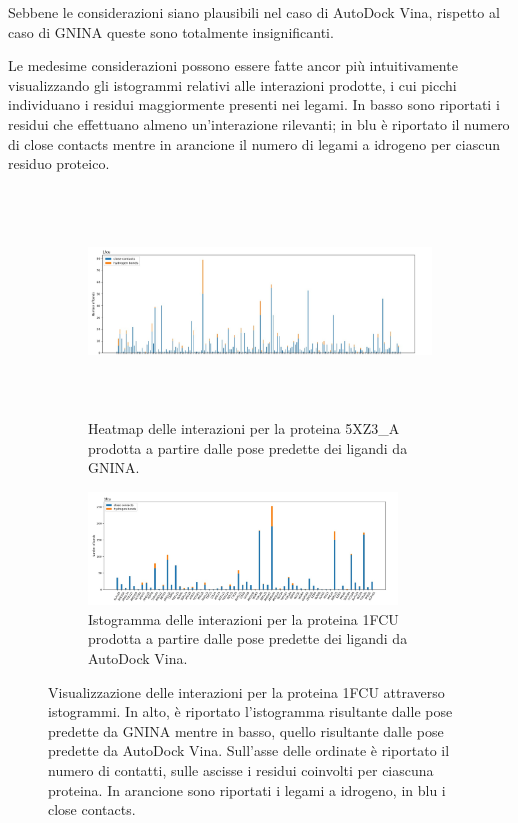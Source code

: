 Sebbene le considerazioni siano plausibili nel caso di AutoDock Vina, rispetto al caso di GNINA queste sono totalmente insignificanti.

Le medesime considerazioni possono essere fatte ancor più intuitivamente visualizzando gli istogrammi relativi alle interazioni prodotte, i cui picchi individuano i residui maggiormente presenti nei legami. In basso sono riportati i residui che effettuano almeno un'interazione rilevanti; in blu è riportato il numero di close contacts mentre in arancione il numero di legami a idrogeno per ciascun residuo proteico.

\begin{figure}
    \centering
    \begin{subfigure}[b]{\textwidth}
        \centering
        \includegraphics[width=\textwidth, height=6cm]{images/chapter4/interactions/interactions_gnina_1fcu.jpg}
        \caption[]%
        {{\small Heatmap delle interazioni per la proteina 5XZ3\_A prodotta a partire dalle pose predette dei ligandi da GNINA.}}    
        \label{fig:interactions_gnina_1fcu}
    \end{subfigure}
    \hfill
    \begin{subfigure}[b]{\textwidth}  
        \centering 
        \includegraphics[width=0.9\textwidth, height=3cm]{images/chapter4/interactions/interactions_vina_1fcu.jpg}
        \caption[]%
        {{\small Istogramma delle interazioni per la proteina 1FCU prodotta a partire dalle pose predette dei ligandi da AutoDock Vina.}}    
        \label{fig:interactions_vina_1fcu}
    \end{subfigure}
    \caption[Visualizzazione degli istogrammi per la proteina 1FCU.]
    {\small Visualizzazione delle interazioni per la proteina 1FCU attraverso istogrammi. In alto, è riportato l'istogramma risultante dalle pose predette da GNINA mentre in basso, quello risultante dalle pose predette da AutoDock Vina. Sull'asse delle ordinate è riportato il numero di contatti, sulle ascisse i residui coinvolti per ciascuna proteina. In arancione sono riportati i legami a idrogeno, in blu i close contacts. } 
    \label{fig:int_1fcu}
\end{figure}


